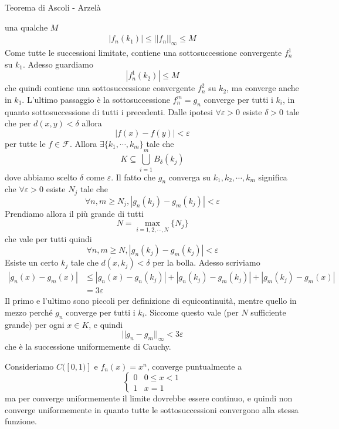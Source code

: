 \documentclass[a4paper]{article}
\begin{document}
\begin{snippetproof}{Teorema di Ascoli - Arzelà}
\begin{iffproof}
        una qualche \(M\)
        \begin{align*}
            |f_n(k_1)| \leq ||f_n||_\infty \leq M
        \end{align*}
        Come tutte le successioni limitate, contiene una sottosuccessione convergente
        \(f_n^1\) su \(k_1\).
        Adesso guardiamo
        \[
            |f_n^1(k_2)| \leq M
        \]
        che quindi contiene una sottosuccessione convergente \(f^2_n\) su \(k_2\),
        ma converge anche in \(k_1\). L'ultimo passaggio
        è la sottosuccessione \(f_n^m = g_n\) converge per tutti i \(k_i\), in quanto
        sottosuccessione di tutti i precedenti.
        Dalle ipotesi \(\forall \varepsilon > 0\) esiste \(\delta > 0\)
        tale che per \(d(x,y) < \delta\) allora
        \[
            |f(x) - f(y)| < \varepsilon
        \]
        per tutte le \(f\in\mathcal{F}\).
        Allora \(\exists \{k_1, \cdots, k_m\}\) tale che
        \[
            K \subseteq \bigcup_{i=1}^m B_\delta(k_j)
        \]
        dove abbiamo scelto \(\delta\) come \(\varepsilon\).
        Il fatto che \(g_n\) converga su \(k_1, k_2, \cdots, k_m\)
        significa che \(\forall \varepsilon > 0\) esiste \(N_j\)
        tale che
        \[
            \forall n,m \geq N_j, |g_n(k_j) - g_m(k_j)| < \varepsilon
        \]
        Prendiamo allora il più grande di tutti
        \[
            N = \max_{i=1,2,\cdots, N}\{N_j\}
        \]
        che vale per tutti quindi
        \[
            \forall n,m \geq N, |g_n(k_j) - g_m(k_j)| < \varepsilon
        \]
        Esiste un certo \(k_j\) tale che \(d(x,k_j) < \delta\) per la bolla.
        Adesso scriviamo
        \begin{align*}
            |g_n(x) - g_m(x)| &\leq
            |g_n(x) - g_n(k_j)| +
            |g_n(k_j) - g_m(k_j)|
            + |g_m(k_j) - g_m(x)| \\
            &= 3\varepsilon
        \end{align*}
        Il primo e l'ultimo sono piccoli per definizione di equicontinuità,
        mentre quello in mezzo perché \(g_n\) converge per tutti i \(k_i\).
        Siccome questo vale (per \(N\) sufficiente grande) per ogni \(x\in K\), e quindi
        \[
            ||g_n - g_m||_\infty < 3\varepsilon
        \]
        che è la successione uniformemente di Cauchy.
    \end{iffproof}
\end{snippetproof}

\begin{snippetexample}{}
    Consideriamo \(C([0,1)]\)
    e \(f_n(x) = x^n\), converge puntualmente a
    \[
        \begin{cases}
            0 & 0 \leq x < 1  \\
            1 & x = 1
        \end{cases}
    \]
    ma per converge uniformemente il limite dovrebbe essere continuo, e quindi
    non converge uniformemente in quanto tutte le sottosuccessioni convergono alla stessa funzione.
\end{snippetexample}
\end{document}
